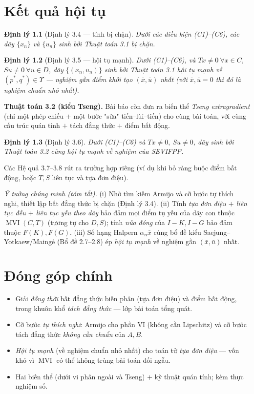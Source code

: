 \documentclass{MyBook}
\theoremstyle{plain}
\newtheorem{theorem}{Định lý}
\theoremstyle{definition}
\newcommand{\Fix}{F}
\DeclareMathOperator{\MVI}{MVI}
\begin{document}
\chapter{Kết quả hội tụ}

\begin{theorem}[Định lý 3.4 --- tính bị chặn]
Dưới các điều kiện (C1)--(C6), các dãy $\{x_n\}$ và $\{u_n\}$ sinh bởi Thuật toán 3.1 bị chặn.
\end{theorem}

\begin{theorem}[Định lý 3.5 --- hội tụ mạnh]
Dưới (C1)--(C6), và $Tx\ne 0\ \forall x\in C$, $Su\ne 0\ \forall u\in D$, dãy $\{(x_n,u_n)\}$ sinh bởi Thuật toán 3.1 hội tụ \emph{mạnh} về $(p^{*},q^{*})\in\Upsilon$ --- nghiệm gần điểm khởi tạo $(\bar{x},\bar{u})$ nhất (với $\bar{x},\bar{u}=0$ thì đó là nghiệm \emph{chuẩn nhỏ nhất}).
\end{theorem}

\noindent\textbf{Thuật toán 3.2 (kiểu Tseng).} Bài báo còn đưa ra biến thể \emph{Tseng extragradient} (chỉ một phép chiếu $+$ một bước "sửa" tiến--lùi--tiến) cho cùng bài toán, với cùng cấu trúc quán tính $+$ tách đẳng thức $+$ điểm bất động.
\begin{theorem}[Định lý 3.6]
Dưới (C1)--(C6) và $Tx\ne0,\ Su\ne0$, dãy sinh bởi Thuật toán 3.2 cũng hội tụ \emph{mạnh} về nghiệm của SEVIFPP.
\end{theorem}
\noindent Các Hệ quả 3.7--3.8 rút ra trường hợp riêng (ví dụ khi bỏ ràng buộc điểm bất động, hoặc $T,S$ liên tục và tựa đơn điệu).

\medskip
\noindent\emph{Ý tưởng chứng minh (tóm tắt).} (i) Nhờ tìm kiếm Armijo và cỡ bước tự thích nghi, thiết lập bất đẳng thức bị chặn (Định lý 3.4). (ii) Tính \emph{tựa đơn điệu $+$ liên tục đều $+$ liên tục yếu theo dãy} bảo đảm mọi điểm tụ yếu của dãy con thuộc $\MVI(C,T)$ (tương tự cho $D,S$); tính \emph{nửa đóng} của $I-K,I-G$ bảo đảm thuộc $\Fix(K),\Fix(G)$. (iii) Số hạng Halpern $\alpha_n\bar{x}$ cùng bổ đề kiểu Saejung--Yotkaew/Maingé (Bổ đề 2.7--2.8) ép \emph{hội tụ mạnh} về nghiệm gần $(\bar{x},\bar{u})$ nhất.

\chapter{Đóng góp chính}
\begin{itemize}[leftmargin=1.4em,itemsep=1pt]
\item Giải \emph{đồng thời} bất đẳng thức biến phân (tựa đơn điệu) và điểm bất động, trong khuôn khổ \emph{tách đẳng thức} --- lớp bài toán tổng quát.
\item Cỡ bước \emph{tự thích nghi}: Armijo cho phần VI (không cần Lipschitz) và cỡ bước tách đẳng thức \emph{không cần chuẩn} của $A,B$.
\item \emph{Hội tụ mạnh} (về nghiệm chuẩn nhỏ nhất) cho toán tử \emph{tựa đơn điệu} --- vốn khó vì $\MVI$ có thể không trùng bài toán đối ngẫu.
\item Hai biến thể (dưới vi phân ngoài và Tseng) $+$ kỹ thuật quán tính; kèm thực nghiệm số.
\end{itemize}
\end{document}
